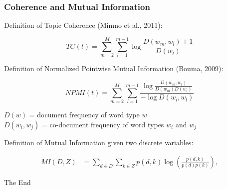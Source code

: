 \documentclass{beamer}
\begin{document}
    \begin{frame}
        \frametitle{Coherence and Mutual Information}
        Definition of Topic Coherence (Mimno et al., 2011):

        \small
        \begin{equation*}
            TC(t) = \sum_{m=2}^{M} \sum_{l = 1}^{m - 1} \log \frac{D(w_m, w_l) + 1}{D(w_l)}
        \end{equation*}
        \normalsize

        Definition of Normalized Pointwise Mutual Information (Bouma, 2009):

        \small
        \begin{equation*}
            NPMI(t) = \sum_{m=2}^{M} \sum_{l = 1}^{m - 1}
            \frac{\log \frac{D(w_m, w_l)}{D(w_m) D(w_l)}}{- \log D(w_i, w_l)}
        \end{equation*}
        \normalsize

        $D(w)$ = document frequency of word type $w$ \\
        $D(w_i, w_j)$ = co-document frequency of word types $w_i$ and $w_j$
        \newline

        Definition of Mutual Information given two discrete variables:

        \small
        \begin{align*}
            MI(D, Z) &= \sum_{d \in D}  \sum_{k \in Z} p(d, k) \log \left( \frac{p(d, k)}{p(d) p(k)} \right),
        \end{align*}
        \normalsize

    \end{frame}

    \begin{frame}
        \Huge{\centerline{The End}}
    \end{frame}
\end{document}
